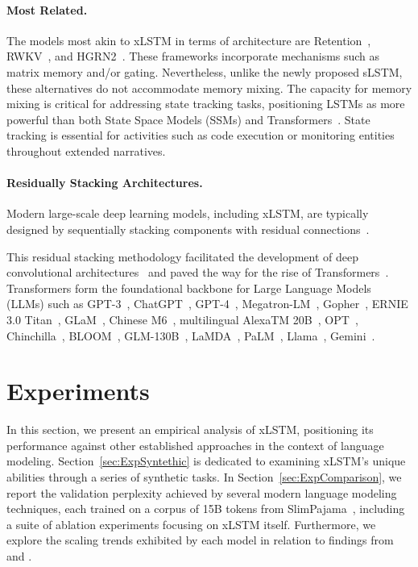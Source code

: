 \paragraph{Most Related.} The models most akin to xLSTM in terms of architecture are Retention~\citep{Sun:23arxiv}, RWKV~\citep{Peng:23arxivshort,Peng:24arxivshort}, and HGRN2~\citep{Qin:24arxiv}. These frameworks incorporate mechanisms such as matrix memory and/or gating. Nevertheless, unlike the newly proposed sLSTM, these alternatives do not accommodate memory mixing. The capacity for memory mixing is critical for addressing state tracking tasks, positioning LSTMs as more powerful than both State Space Models (SSMs) and Transformers~\citep{Merrill:24,Deletang:23}. State tracking is essential for activities such as code execution or monitoring entities throughout extended narratives.

\paragraph{Residually Stacking Architectures.} Modern large-scale deep learning models, including xLSTM, are typically designed by sequentially stacking components with residual connections~\citep{Srivastava:15,He:16}.

This residual stacking methodology facilitated the development of deep convolutional architectures~\citep{He:16} and paved the way for the rise of Transformers~\citep{Vaswani:17}. Transformers form the foundational backbone for Large Language Models (LLMs) such as GPT-3~\citep{Brown:20short}, ChatGPT~\citep{Schulman:22short}, GPT-4~\citep{Achiam:23gpt4short}, Megatron-LM~\citep{Shoeybi:19}, Gopher~\citep{Rae:21short}, ERNIE 3.0 Titan~\citep{Wang:21arxivshort}, GLaM~\citep{Du:21glamshort}, Chinese M6~\citep{Lin:21}, multilingual AlexaTM 20B~\citep{Soltan:22}, OPT~\citep{Zhang:22opt}, Chinchilla~\citep{Hoffmann:22short}, BLOOM~\citep{Scao:22arxivshort}, GLM-130B~\citep{Zeng:22arxivshort}, LaMDA~\citep{Thoppilan:22short}, PaLM~\citep{Chowdhery:22short}, Llama~\citep{Touvron:23arxiv}, Gemini~\citep{GeminiTeam:23arxiv,Reid:24arxiv}.

\section{Experiments}
\label{sec:Exp}

In this section, we present an empirical analysis of xLSTM, positioning its performance against other established approaches in the context of language modeling. Section~\ref{sec:ExpSyntethic} is dedicated to examining xLSTM's unique abilities through a series of synthetic tasks. In Section~\ref{sec:ExpComparison}, we report the validation perplexity achieved by several modern language modeling techniques, each trained on a corpus of 15B tokens from SlimPajama~\citep{Soboleva:23}, including a suite of ablation experiments focusing on xLSTM itself. Furthermore, we explore the scaling trends exhibited by each model in relation to findings from \citet{Kaplan:20} and \citet{Brown:20short}.


